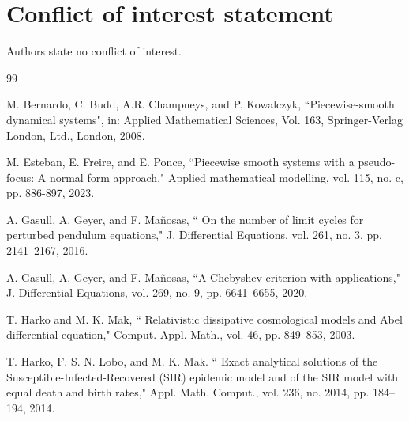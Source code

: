 \documentclass[11pt]{amsart}
\theoremstyle{remark}
\theoremstyle{definition}
\begin{document}
\section*{Conflict of interest statement}
Authors state no conflict of  interest.

\begin{thebibliography}{99}








 M. Bernardo, C. Budd,  A.R. Champneys, and P. Kowalczyk,    ``Piecewise-smooth dynamical systems", in: Applied Mathematical
Sciences, Vol. 163, Springer-Verlag London, Ltd., London, 2008.


 M. Esteban,  E. Freire, and E. Ponce,   ``Piecewise smooth systems with a pseudo-focus: A normal form approach,"  Applied mathematical modelling,  vol. 115, no. c,   pp.   886-897,  2023.


 A. Gasull, A. Geyer, and F. Ma\~{n}osas,  `` On the number of limit cycles for perturbed pendulum
equations,"   J. Differential Equations, vol.  261, no. 3,   pp. 2141--2167, 2016.

 A. Gasull, A. Geyer, and F. Ma\~{n}osas,  ``A Chebyshev criterion with applications,"  J. Differential Equations, vol.  269, no. 9,   pp. 6641--6655,  2020.

 T. Harko and M. K. Mak,  `` Relativistic dissipative cosmological models and Abel differential equation,"  Comput. Appl. Math.,  vol.  46,     pp. 849--853,   2003.

 T. Harko,  F. S. N. Lobo,  and  M. K. Mak.  `` Exact analytical solutions of the Susceptible-Infected-Recovered (SIR) epidemic model and of the SIR model with equal death and birth rates,"  Appl. Math. Comput., 
vol.   236,  no. 2014, pp. 184--194,  2014.


\end{thebibliography}
\end{document}
